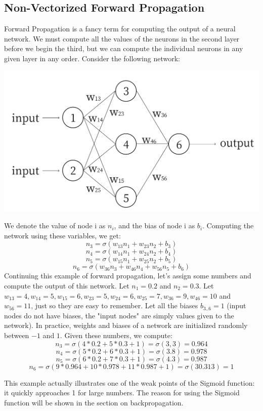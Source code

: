 \documentclass{article}
\begin{document}
\subsection{Non-Vectorized Forward Propagation}
Forward Propagation is a fancy term for computing the output of a neural network. We must compute all the values of the neurons in the second layer before we begin the third, but we can compute the individual neurons in any given layer in any order. Consider the following network:
\begin{center}
\includegraphics[scale=0.3]{nn1}
\end{center}
We denote the value of node i as $n_i$, and the bias of node i as $b_i$. Computing the network using these variables, we get:
\[n_3 = \sigma(w_{13}n_1 + w_{23}n_2 + b_3)\]
\[n_4 = \sigma(w_{14}n_1 + w_{24}n_2 + b_4)\]
\[n_5 = \sigma(w_{15}n_1 + w_{25}n_2 + b_5)\]
\[n_6 = \sigma(w_{36}n_3 + w_{46}n_4 + w_{56}n_5 + b_6)\]
Continuing this example of forward propagation, let's assign some numbers and compute the output of this network.
Let $n_1 = 0.2$ and $n_2 = 0.3$.
Let $w_{13} = 4, w_{14} = 5, w_{15} = 6, w_{23} = 5, w_{24} = 6, w_{25} = 7, w_{36}=9, w_{46} = 10$ and $w_{56} = 11$, just so they are easy to remember. Let all the biases $b_{3..6} = 1$ (input nodes do not have biases, the "input nodes" are simply values given to the network). In practice, weights and biases of a network are initialized randomly between $-1$ and $1$. Given these numbers, we compute:
\[n_3 = \sigma(4*0.2 + 5*0.3 + 1) = \sigma(3,3) = 0.964\]
\[n_4 = \sigma(5*0.2 + 6*0.3 + 1) = \sigma(3.8) = 0.978\]
\[n_5 = \sigma(6*0.2 + 7*0.3 + 1) = \sigma(4.3) = 0.987\]
\[n_6 = \sigma(9*0.964 + 10*0.978 + 11*0.987 + 1) = \sigma(30.313) = 1\]

This example actually illustrates one of the weak points of the Sigmoid function: it quickly approaches 1 for large numbers. The reason for using the Sigmoid function will be shown in the section on backpropagation.
\end{document}
